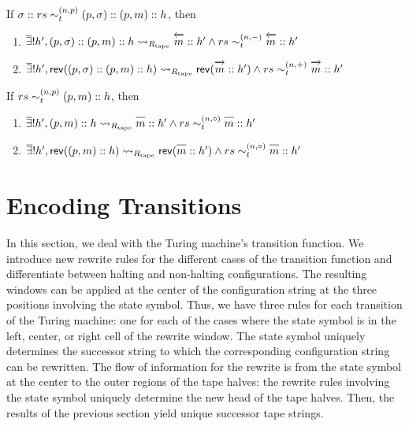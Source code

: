 \begin{lemma}\label{lem:tape_rem}
  If $\sigma :: rs \sim_t^{(n, p)} (p, \sigma) :: (p, m) :: h$, then 
  \begin{enumerate}
    \item $\mexists h', (p, \sigma) :: (p, m) :: h \strent{\Rtape} \polneg{m} :: h' \land rs \reprtt{n}{-} \polneg{m} :: h'$
    \item $\mexists h', \rev{((p, \sigma) :: (p, m) :: h)} \strent{\Rtape} \rev{(\polpos{m} :: h')} \land rs \reprtt{n}{+} \polpos{m} :: h'$
  \end{enumerate}
\end{lemma}

\begin{lemma}\label{lem:tape_stay}
  If $rs \sim_t^{(n, p)} (p, m) :: h$, then 
  \begin{enumerate}
    \item $\mexists h', (p, m) :: h \strent{\Rtape} \polneut{m} :: h' \land rs \reprtt{n}{\circ} \polneut{m} :: h'$
    \item $\mexists h', \rev{((p, m) :: h)} \strent{\Rtape} \rev{(\polneut{m} :: h')} \land rs \reprtt{n}{\circ} \polneut{m} :: h'$
  \end{enumerate}
\end{lemma}

\section{Encoding Transitions}
In this section, we deal with the Turing machine's transition function. We introduce new rewrite rules for the different cases of the transition function and differentiate between halting and non-halting configurations.
The resulting windows can be applied at the center of the configuration string at the three positions involving the state symbol. Thus, we have three rules for each transition of the Turing machine: one for each of the cases where the state symbol is in the left, center, or right cell of the rewrite window.
The state symbol uniquely determines the successor string to which the corresponding configuration string can be rewritten. The flow of information for the rewrite is from the state symbol at the center to the outer regions of the tape halves: the rewrite rules involving the state symbol uniquely determine the new head of the tape halves. Then, the results of the previous section yield unique successor tape strings.

